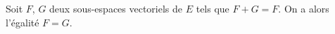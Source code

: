 Soit $F$, $G$ deux sous-espaces vectoriels de $E$ tels que $F+G=F$. On a alors l'égalité $F=G$.

\begin{reponses}
\end{reponses}

